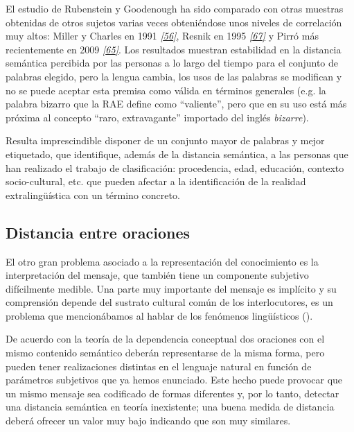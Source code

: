 \documentclass[a4paper,12pt,spanish]{book}
\begin{document}
El estudio de Rubenstein y Goodenough ha sido comparado con otras muestras obtenidas
de otros sujetos varias veces obteniéndose unos niveles de correlación muy altos: Miller
y Charles en 1991 \label{2.problem/index:id5}{\hyperref[zreferences:miller1991]{\emph{{[}56{]}}}}, Resnik en 1995 \label{2.problem/index:id6}{\hyperref[zreferences:resnik1995]{\emph{{[}67{]}}}} y Pirró más
recientemente en 2009 \label{2.problem/index:id7}{\hyperref[zreferences:pirro2009]{\emph{{[}65{]}}}}. Los resultados muestran estabilidad en
la distancia semántica percibida por las personas a lo largo del tiempo para el conjunto de
palabras elegido, pero la lengua cambia, los usos de las palabras se modifican y no se
puede aceptar esta premisa como válida en términos generales (e.g. la palabra bizarro que
la RAE define como ``valiente'', pero que en su uso está más próxima al concepto
``raro, extravagante'' importado del inglés \emph{bizarre}).

Resulta imprescindible disponer de un conjunto mayor de palabras y mejor etiquetado, que
identifique, además de la distancia semántica, a las personas que han
realizado el trabajo de clasificación: procedencia, edad, educación, contexto
socio-cultural, etc. que pueden afectar a la identificación de la realidad
extralingüística con un término concreto.


\subsection{Distancia entre oraciones}
\label{2.problem/index:distancia-entre-oraciones}
El otro gran problema asociado a la representación del conocimiento es la interpretación
del mensaje, que también tiene un componente subjetivo difícilmente medible. Una parte
muy importante del mensaje es implícito y su comprensión depende del sustrato cultural
común de los interlocutores, es un problema que mencionábamos al hablar de los
fenómenos lingüísticos ({\hyperref[1.state-of-the-art/iii.distancia-semantica:fenomenos-linguisticos]{\emph{}}}).

De acuerdo con la teoría de la dependencia conceptual dos oraciones con el mismo contenido
semántico deberán representarse de la misma forma, pero pueden tener realizaciones
distintas en el lenguaje natural en función de parámetros subjetivos que ya hemos enunciado.
Este hecho puede provocar que un mismo mensaje sea codificado de formas diferentes
y, por lo tanto, detectar una distancia semántica en teoría inexistente; una buena medida
de distancia deberá ofrecer un valor muy bajo indicando que son muy similares.
\end{document}

